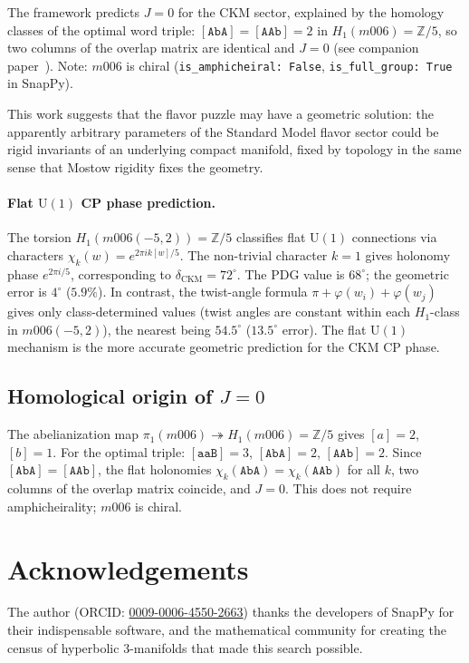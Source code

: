 \documentclass[11pt,a4paper]{article}
\begin{document}
The framework predicts $J = 0$ for the CKM sector, explained by the homology classes of the optimal word triple: $[\texttt{AbA}] = [\texttt{AAb}] = 2$ in $H_1(m006)=\mathbb{Z}/5$, so two columns of the overlap matrix are identical and $J=0$ (see companion paper~\cite{Gentry:CP}). Note: $m006$ is chiral (\texttt{is\_amphicheiral: False}, \texttt{is\_full\_group: True} in SnapPy).

This work suggests that the flavor puzzle may have a geometric 
solution: the apparently arbitrary parameters of the Standard Model 
flavor sector could be rigid invariants of an underlying compact 
manifold, fixed by topology in the same sense that Mostow rigidity 
fixes the geometry.

\paragraph{Flat $\mathrm{U}(1)$ CP phase prediction.}
The torsion $H_1(m006(-5,2)) = \mathbb{Z}/5$ classifies flat
$\mathrm{U}(1)$ connections via characters $\chi_k(w) = e^{2\pi i k[w]/5}$.
The non-trivial character $k=1$ gives holonomy phase $e^{2\pi i/5}$,
corresponding to $\delta_{\mathrm{CKM}} = 72^\circ$.
The PDG value is $68^\circ$; the geometric error is $4^\circ$ ($5.9\%$).
In contrast, the twist-angle formula $\pi + \varphi(w_i) + \varphi(w_j)$
gives only class-determined values (twist angles are constant within
each $H_1$-class in $m006(-5,2)$), the nearest being $54.5^\circ$
($13.5^\circ$ error). The flat $\mathrm{U}(1)$ mechanism is the
more accurate geometric prediction for the CKM CP phase.

\subsection*{Homological origin of $J=0$}
\label{subsec:hom_cp}
The abelianization map $\pi_1(m006)\twoheadrightarrow H_1(m006)=\mathbb{Z}/5$
gives $[a]=2$, $[b]=1$. For the optimal triple:
$[\texttt{aaB}]=3$, $[\texttt{AbA}]=2$, $[\texttt{AAb}]=2$.
Since $[\texttt{AbA}]=[\texttt{AAb}]$, the flat holonomies
$\chi_k(\texttt{AbA})=\chi_k(\texttt{AAb})$ for all $k$,
two columns of the overlap matrix coincide, and $J=0$.
This does not require amphicheirality; $m006$ is chiral.

\section*{Acknowledgements}
The author (ORCID: \href{https://orcid.org/0009-0006-4550-2663}{0009-0006-4550-2663})
thanks the developers of SnapPy for their indispensable
software, and the mathematical community for creating the census of
hyperbolic 3-manifolds that made this search possible.
\end{document}
